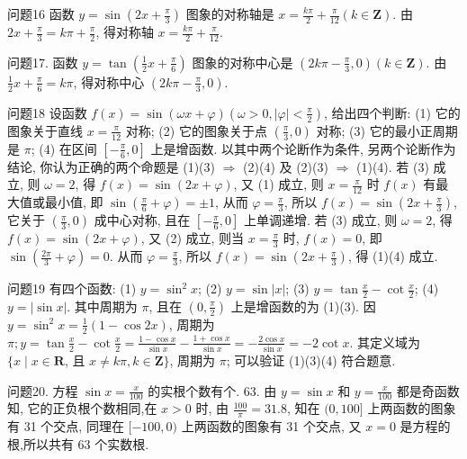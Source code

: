 问题16 函数 $y=\sin \left(2 x+\frac{\pi}{3}\right)$ 图象的对称轴是
$x=\frac{k \pi}{2}+\frac{\pi}{12}(k \in \mathbf{Z})$. 由 $2 x+\frac{\pi}{3}=k \pi+\frac{\pi}{2}$, 得对称轴 $x=\frac{k \pi}{2}+\frac{\pi}{12}$.



问题17. 函数 $y=\tan \left(\frac{1}{2} x+\frac{\pi}{6}\right)$ 图象的对称中心是
$\left(2 k \pi-\frac{\pi}{3}, 0\right)(k \in \mathbf{Z})$. 由 $\frac{1}{2} x+\frac{\pi}{6}=k \pi$, 得对称中心 $\left(2 k \pi-\frac{\pi}{3}, 0\right)$.



问题18 设函数 $f(x)=\sin (\omega x+\varphi)\left(\omega>0,|\varphi|<\frac{\pi}{2}\right)$, 给出四个判断:
(1) 它的图象关于直线 $x=\frac{\pi}{12}$ 对称; (2) 它的图象关于点 $\left(\frac{\pi}{3}, 0\right)$ 对称;
(3) 它的最小正周期是 $\pi$; (4) 在区间 $\left[-\frac{\pi}{6}, 0\right]$ 上是增函数.
以其中两个论断作为条件, 另两个论断作为结论, 你认为正确的两个命题是
(1)(3) $\Rightarrow$ (2)(4) 及 (2)(3) $\Rightarrow$ (1)(4). 若 (3) 成立, 则 $\omega=2$, 得 $f(x)=\sin (2 x+\varphi)$, 又 (1) 成立, 则 $x=\frac{\pi}{12}$ 时 $f(x)$ 有最大值或最小值, 即 $\sin \left(\frac{\pi}{6}+\varphi\right)= \pm 1$, 从而
$\varphi=\frac{\pi}{3}$, 所以 $f(x)=\sin \left(2 x+\frac{\pi}{3}\right)$, 它关于 $\left(\frac{\pi}{3}, 0\right)$ 成中心对称, 且在 $\left[-\frac{\pi}{6}, 0\right]$ 上单调递增.
若 (3) 成立, 则 $\omega=2$, 得 $f(x)=\sin (2 x+\varphi)$, 又 (2) 成立, 则当 $x=\frac{\pi}{3}$ 时, $f(x)=0$, 即 $\sin \left(\frac{2 \pi}{3}+\varphi\right)=0$. 从而 $\varphi=\frac{\pi}{3}$, 所以 $f(x)=\sin \left(2 x+\frac{\pi}{3}\right)$, 得 (1)(4) 成立.



问题19 有四个函数: (1) $y=\sin ^2 x$; (2) $y=\sin |x|$; (3) $y=\tan \frac{x}{2}-\cot \frac{x}{2}$; (4) $y= |\sin x|$. 其中周期为 $\pi$, 且在 $\left(0, \frac{\pi}{2}\right)$ 上是增函数的为
(1)(3). 因 $y=\sin ^2 x=\frac{1}{2}(1-\cos 2 x)$, 周期为 $\pi ; y=\tan \frac{x}{2}-\cot \frac{x}{2}= \frac{1-\cos x}{\sin x}-\frac{1+\cos x}{\sin x}=-\frac{2 \cos x}{\sin x}=-2 \cot x$. 其定义域为 $\{x \mid x \in \mathbf{R}$, 且 $x \neq k \pi, k \in \mathbf{Z}\}$, 周期为 $\pi$; 可以验证 (1)(3)(4) 符合题意.



问题20. 方程 $\sin x=\frac{x}{100}$ 的实根个数有个.
63. 由 $y=\sin x$ 和 $y=\frac{x}{100}$ 都是奇函数知, 它的正负根个数相同,在 $x>0$ 时, 由 $\frac{100}{\pi}=31.8$, 知在 $(0,100]$ 上两函数的图象有 31 个交点, 同理在 $[-100,0)$ 上两函数的图象有 31 个交点, 又 $x=0$ 是方程的根,所以共有 63 个实数根.




